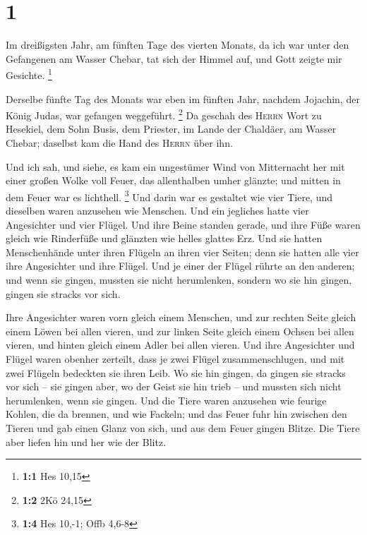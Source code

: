 \hypertarget{section}{%
\section{1}\label{section}}

 Im dreißigsten Jahr, am fünften Tage des vierten Monats,
da ich war unter den Gefangenen am Wasser Chebar, tat sich der Himmel
auf, und Gott zeigte mir Gesichte. \footnote{\textbf{1:1} Hes 10,15}

 Derselbe fünfte Tag des Monats war eben im fünften Jahr,
nachdem Jojachin, der König Judas, war gefangen weggeführt. \footnote{\textbf{1:2}
  2Kö 24,15}  Da geschah des \textsc{Herrn} Wort zu
Hesekiel, dem Sohn Busis, dem Priester, im Lande der Chaldäer, am Wasser
Chebar; daselbst kam die Hand des \textsc{Herrn} über ihn.

 Und ich sah, und siehe, es kam ein ungestümer Wind von
Mitternacht her mit einer großen Wolke voll Feuer, das allenthalben
umher glänzte; und mitten in dem Feuer war es lichthell. \footnote{\textbf{1:4}
  Hes 10,-1; Offb 4,6-8}  Und darin war es gestaltet wie
vier Tiere, und dieselben waren anzusehen wie Menschen. 
Und ein jegliches hatte vier Angesichter und vier Flügel. 
Und ihre Beine standen gerade, und ihre Füße waren gleich wie Rinderfüße
und glänzten wie helles glattes Erz.  Und sie hatten
Menschenhände unter ihren Flügeln an ihren vier Seiten; denn sie hatten
alle vier ihre Angesichter und ihre Flügel.  Und je einer
der Flügel rührte an den anderen; und wenn sie gingen, mussten sie nicht
herumlenken, sondern wo sie hin gingen, gingen sie stracks vor sich.

 Ihre Angesichter waren vorn gleich einem Menschen, und
zur rechten Seite gleich einem Löwen bei allen vieren, und zur linken
Seite gleich einem Ochsen bei allen vieren, und hinten gleich einem
Adler bei allen vieren.  Und ihre Angesichter und Flügel
waren obenher zerteilt, dass je zwei Flügel zusammenschlugen, und mit
zwei Flügeln bedeckten sie ihren Leib.  Wo sie hin
gingen, da gingen sie stracks vor sich -- sie gingen aber, wo der Geist
sie hin trieb -- und mussten sich nicht herumlenken, wenn sie gingen.
 Und die Tiere waren anzusehen wie feurige Kohlen, die da
brennen, und wie Fackeln; und das Feuer fuhr hin zwischen den Tieren und
gab einen Glanz von sich, und aus dem Feuer gingen Blitze.
 Die Tiere aber liefen hin und her wie der Blitz.

